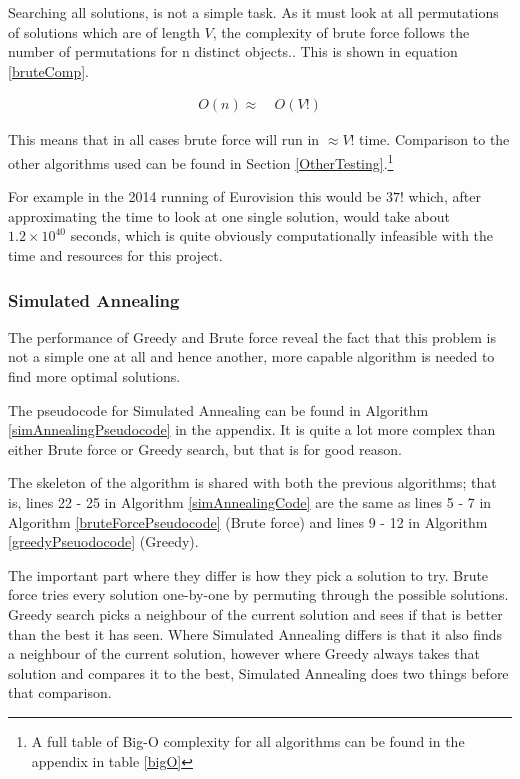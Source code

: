 \documentclass[12pt]{report}
\begin{document}
Searching all solutions, is not a simple task. As it must look at all permutations of solutions which are of length $V$, the complexity of brute force follows the number of permutations for n distinct objects.\cite{Permutation}. This is shown in equation \ref{bruteComp}.

\begin{equation}\label{bruteComp}
\begin{aligned}
	O(n) \approx{} & \ O(V!)
\end{aligned}
\end{equation}

This means that in all cases brute force will run in $\approx V!$ time. Comparison to the other algorithms used can be found in Section \ref{OtherTesting}.\footnote{A full table of Big-O complexity for all algorithms can be found in the appendix in table \ref{bigO}}

For example in the 2014 running of Eurovision this would be $37!$ which, after approximating the time to look at one single solution, would take about $1.2\times10^{40}$ seconds, which is quite obviously computationally infeasible with the time and resources for this project.

\subsubsection{Simulated Annealing}
The performance of Greedy and Brute force reveal the fact that this problem is not a simple one at all and hence another, more capable algorithm is needed to find more optimal solutions. 

The pseudocode for Simulated Annealing can be found in Algorithm \ref{simAnnealingPseudocode} in the appendix. It is quite a lot more complex than either Brute force or Greedy search, but that is for good reason.

The skeleton of the algorithm is shared with both the previous algorithms; that is, lines 22 - 25 in Algorithm \ref{simAnnealingCode} are the same as lines 5 - 7 in Algorithm \ref{bruteForcePseudocode} (Brute force) and lines 9 - 12 in Algorithm \ref{greedyPseuodocode} (Greedy).

The important part where they differ is how they pick a solution to try. Brute force tries every solution one-by-one by permuting through the possible solutions. Greedy search picks a neighbour of the current solution and sees if that is better than the best it has seen. Where Simulated Annealing differs is that it also finds a neighbour of the current solution, however where Greedy always takes that solution and compares it to the best, Simulated Annealing does two things before that comparison.
\end{document}
